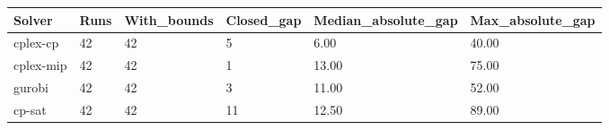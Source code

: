 \begin{tabular}{llllll}
\hline
Solver & Runs & With\_bounds & Closed\_gap & Median\_absolute\_gap & Max\_absolute\_gap \\
\hline
cplex-cp & 42 & 42 & 5 & 6.00 & 40.00 \\
cplex-mip & 42 & 42 & 1 & 13.00 & 75.00 \\
gurobi & 42 & 42 & 3 & 11.00 & 52.00 \\
cp-sat & 42 & 42 & 11 & 12.50 & 89.00 \\
\hline
\end{tabular}
